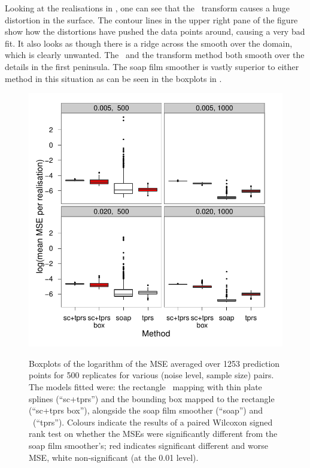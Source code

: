 Looking at the realisations in , one can see that the \sch\ transform causes a huge distortion in the surface. The contour lines in the upper right pane of the figure show how the distortions have pushed the data points around, causing a very bad fit. It also looks as though there is a ridge across the smooth over the domain, which is clearly unwanted. The \tprs\ and the transform method both smooth over the details in the first peninsula. The soap film smoother is vastly superior to either method in this situation as can be seen in the boxplots in .

\begin{figure}[t]
\centering
\includegraphics[width=\textwidth]{sc/tablecode/wt2-boxplot.pdf} \\
\caption{Boxplots of the logarithm of the MSE averaged over 1253 prediction points for 500 replicates for various (noise level, sample size) pairs. The models fitted were: the rectangle \sch\ mapping with thin plate splines (``sc+tprs'') and the bounding box mapped to the rectangle (``sc+tprs box''), alongside the soap film smoother (``soap'') and \tprs\ (``tprs''). Colours indicate the results of a paired Wilcoxon signed rank test on whether the MSEs were significantly different from the soap film smoother's; red indicates significant different and worse MSE, white non-significant (at the 0.01 level).}
\label{wigglytop2-boxplots}
\end{figure}

